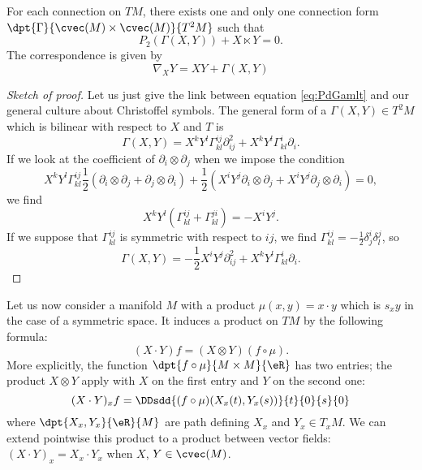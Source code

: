 \begin{lemma}
For each connection on $TM$, there exists one and only one connection form $\dpt{\Gamma}{\cvec(M)\times\cvec(M)}{T^2M}$ such that
\begin{equation} \label{eq:PdGamlt}
  P_2(\Gamma(X,Y))+X\ltimes Y=0.
\end{equation}
The correspondence is given by
\begin{equation}
  \nabla_XY=XY+\Gamma(X,Y)
\end{equation}


\begin{proof}[Sketch of proof]
Let us just give the link between equation \eqref{eq:PdGamlt} and our general culture about Christoffel symbols. The general form of a $\Gamma(X,Y)\in T^2M$ which is bilinear with respect to $X$ and $T$ is
\[ 
  \Gamma(X,Y)=X^kY^l\Gamma_{kl}^{ij}\partial^2_{ij}+X^kY^l\Gamma_{kl}^i\partial_i.
\]
If we look at the coefficient of $\partial_i\otimes\partial_j$ when we impose the condition
\[ 
  X^kY^l\Gamma_{kl}^{ij}\frac{1}{2}(\partial_i\otimes\partial_j+\partial_j\otimes\partial_i)+\frac{1}{2}(X^iY^j\partial_i\otimes\partial_j+X^iY^j\partial_j\otimes\partial_i)=0,
\]
we find
\[ 
  X^kY^l(\Gamma_{kl}^{ij}+\Gamma_{kl}^{ji})=-X^iY^j.
\]
If we suppose that $\Gamma_{kl}^{ij}$ is symmetric with respect to $ij$, we find $\Gamma_{kl}^{ij}=-\frac{1}{2}\delta_j^i\delta_l^j$, so
\begin{equation}
 \Gamma(X,Y)=-\frac{1}{2}X^iY^j\partial^2_{ij}+X^kY^l\Gamma_{kl}^i\partial_i.
\end{equation}


\end{proof}


\end{lemma}

Let us now consider a manifold $M$ with a product $\mu(x,y)=x\cdot y$ which is $s_xy$ in the case of a symmetric space. It induces a product on $TM$ by the following formula:
\begin{equation}  \label{eq:defcdotXY}
(X\cdot Y)f=(X\otimes Y)(f\circ \mu).
\end{equation}
More explicitly, the function $\dpt{f\circ\mu}{M\times M}{\eR}$ has two entries; the product $X\otimes Y$ apply with $X$ on the first entry and $Y$ on the second one:
\[ 
  (X\cdot Y)_xf=\DDsdd{ (f\circ\mu)(X_x(t),Y_x(s)) }{t}{0}{s}{0}
\]
where $\dpt{X_x,Y_x}{\eR}{M}$ are path defining $X_x$ and $Y_x\in T_xM$. We can extend pointwise this product to a product between vector fields: $(X\cdot Y)_x=X_x\cdot Y_x$ when $X$, $Y\in\cvec(M)$.

